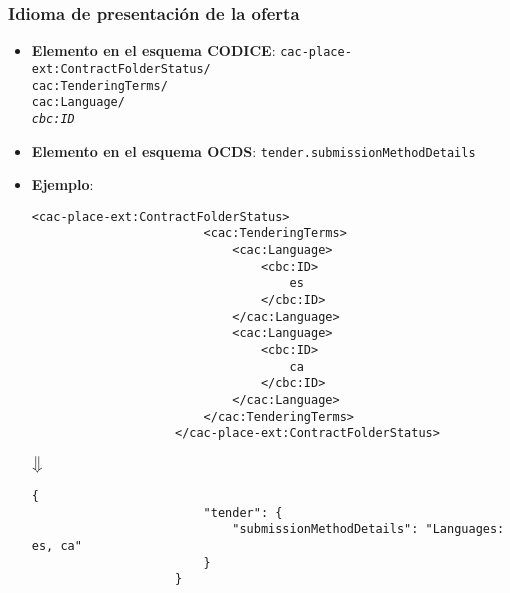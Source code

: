         \subsubsection{Idioma de presentación de la oferta}
        \begin{itemize}
            \item \textbf{Elemento en el esquema CODICE}:
                \tabto{7.6cm} \texttt{cac-place-ext:ContractFolderStatus/} \\
                \tabto{7.6cm} \texttt{cac:TenderingTerms/} \\
                \tabto{7.6cm} \texttt{cac:Language/} \\
                \tabto{7.6cm} \texttt{\textit{cbc:ID}}
            \item \textbf{Elemento en el esquema OCDS}:
                \tabto{7.6cm} \texttt{tender.submissionMethodDetails}
            \item \textbf{Ejemplo}: \\
                \begin{lstlisting}[language=lXML]
                    <cac-place-ext:ContractFolderStatus>
                        <cac:TenderingTerms>
                            <cac:Language>
                                <cbc:ID>
                                    es
                                </cbc:ID>
                            </cac:Language>
                            <cac:Language>
                                <cbc:ID>
                                    ca
                                </cbc:ID>
                            </cac:Language>
                        </cac:TenderingTerms>
                    </cac-place-ext:ContractFolderStatus>
                \end{lstlisting}
                
                \begin{center}
                    $\big\Downarrow$
                \end{center}
                
                \begin{lstlisting}[language=lJSON]
                    {
                        "tender": {
                            "submissionMethodDetails": "Languages: es, ca"
                        }
                    }
                \end{lstlisting}
        \end{itemize}
        
